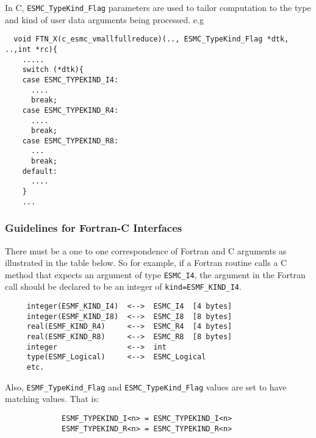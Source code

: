 In C, {\tt ESMC\_TypeKind\_Flag} parameters are used to tailor computation to the type and kind of user data arguments being processed. e.g
\begin{verbatim}
  void FTN_X(c_esmc_vmallfullreduce)(.., ESMC_TypeKind_Flag *dtk, ..,int *rc){
    .....      
    switch (*dtk){
    case ESMC_TYPEKIND_I4:
      ....
      break;
    case ESMC_TYPEKIND_R4:
      ....
      break;
    case ESMC_TYPEKIND_R8:
      ...         
      break;
    default:
      ....
    }
    ...
\end{verbatim}

\subsubsection{Guidelines for Fortran-C Interfaces}

There must be a one to one correspondence of Fortran and C arguments as illustrated in the table below. So for example, if a Fortran routine calls a C method that expects an argument of type {\tt ESMC\_I4}, the argument in the Fortran call should be declared to be an integer of {\tt kind=ESMF\_KIND\_I4}.
\begin{verbatim}
     integer(ESMF_KIND_I4)  <-->  ESMC_I4  [4 bytes]
     integer(ESMF_KIND_I8)  <-->  ESMC_I8  [8 bytes]
     real(ESMF_KIND_R4)     <-->  ESMC_R4  [4 bytes]
     real(ESMF_KIND_R8)     <-->  ESMC_R8  [8 bytes]
     integer                <-->  int
     type(ESMF_Logical)     <-->  ESMC_Logical
     etc.
\end{verbatim}
Also, {\tt ESMF\_TypeKind\_Flag} and {\tt ESMC\_TypeKind\_Flag} values are set to have matching values. That is:
\begin{verbatim}
             ESMF_TYPEKIND_I<n> = ESMC_TYPEKIND_I<n>
             ESMF_TYPEKIND_R<n> = ESMC_TYPEKIND_R<n>
\end{verbatim}
















